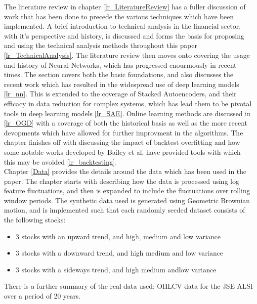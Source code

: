 \documentclass[a4paper,11pt,oneside]{article}
\theoremstyle{plain}
\theoremstyle{definition}
\begin{document}
The literature review in chapter \ref{lr_LiteratureReview} has a fuller discussion of work that has been done to precede the various techniques which have been implemented. A brief introduction to technical analysis in the financial sector, with it's perspective and history, is discussed and forms the basis for proposing and using the technical analysis methods throughout this paper \ref{lr_TechnicalAnalysis}. The literature review then moves onto covering the usage and history of Neural Networks, which has progressed enourmously in recent times. The section covers both the basic foundations, and also discusses the recent work which has resulted in the widespread use of deep learning models \ref{lr_nn}. This is extended to the coverage of Stacked Autoencoders, and their efficacy in data reduction for complex systems, which has lead them to be pivotal tools in deep learning models \ref{lr_SAE}. Online learning methods are discussed in \ref{lr_OGD} with a coverage of both the historical basis as well as the more recent devopments which have allowed for further improvment in the algorithms. The chapter finishes off with discussing the impact of backtest overfitting and how some notable works developed by Bailey et al. have provided tools with which this may be avoided \ref{lr_backtesting}.
~\\\newline
Chapter \ref{Data} provides the details around the data which has been used in the paper. The chapter starts with describing how the data is processed using log feature fluctuations, and then is expanded to include the fluctuations over rolling window periods. The synthetic data used is generated using Geometric Brownian motion, and is implemented such that each randomly seeded dataset consists of the following stocks:
\begin{itemize}
	\item 3 stocks with an upward trend, and high, medium and low variance
	\item 3 stocks with a downward trend, and high medium and low variance
	\item 3 stocks with a sideways trend, and high medium andlow variance
\end{itemize}
There is a further summary of the real data used: OHLCV data for the JSE ALSI over a period of 20  years.
~\\\newline
\end{document}
